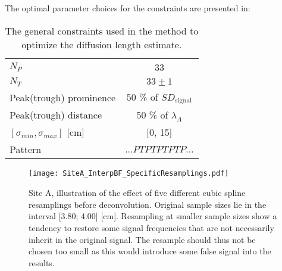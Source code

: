 \documentclass[../../CompleteThesis2/Complete_2ndDraft]{subfiles}
\begin{document}
The optimal parameter choices for the constraints are presented in:
\begin{table}[ht]
	\centering
	\begin{tabular}{lc}
		\toprule 	
		$N_P$ & 33\\[0.15cm]
		$N_T$ & $33\pm 1$\\[0.15cm]
		Peak(trough) prominence & 50 \% of $SD_{\text{signal}}$\\[0.15cm]
		Peak(trough) distance & 50 \% of $\lambda_A$\\[0.15cm]
		$[\sigma_{min}, \sigma_{max}]$ [cm] & [0, 15]\\[0.15cm]
		Pattern & $...PTPTPTPTP...$\\
		\bottomrule
	\end{tabular}
	\caption[Constraint parameters]{The general constraints used in the method to optimize the diffusion length estimate.}
	\label{Tab:ConstraintParams}
\end{table}
\begin{figure}[!]
	\centering
	\texttt{[image: SiteA\_InterpBF\_SpecificResamplings.pdf]}
	\caption[Back diffused data, Site A, different resamplings before deconvolution.]{\small Site A, illustration of the effect of five different cubic spline resamplings before deconvolution. Original sample sizes lie in the interval [3.80; 4.00] [cm]. Resampling at smaller sample sizes show a tendency to restore some signal frequencies that are not necessarily inherit in the original signal. The resample should thus not be chosen too small as this would introduce some false signal into the results.}
	\label{Fig:COMPMETH_SiteA_interpBF_SpecificSamplings}
\end{figure}
\end{document}
